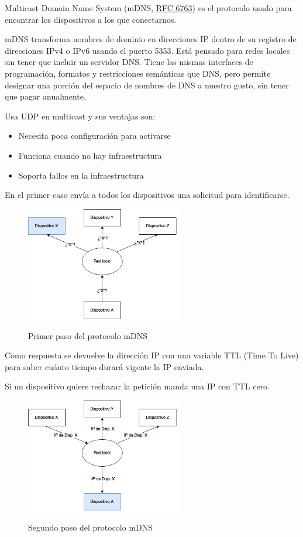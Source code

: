 Multicast Domain Name System (mDNS, \href{https://tools.ietf.org/html/rfc6763}{RFC 6763}) es el protocolo usado para encontrar los dispositivos a los que conectarnos.

mDNS transforma nombres de dominio en direcciones IP dentro de su registro de direcciones IPv4 o IPv6 usando el puerto 5353. Está pensado para redes locales sin tener que incluir un servidor DNS.
Tiene las mismas interfaces de programación, formatos y restricciones semánticas que DNS, pero permite designar una porción del espacio de nombres de DNS a nuestro gusto, sin tener que pagar anualmente.

Usa UDP en multicast y sus ventajas son:
\begin{itemize}
	\item Necesita poca configuración para activarse
	\item Funciona cuando no hay infraestructura
	\item Soporta fallos en la infraestructura
\end{itemize}

En el primer caso envía a todos los dispositivos una solicitud para identificarse.

\begin{figure}[H]
	\centering
	\includegraphics[width=0.6\textwidth]{./Imagenes/mdns1.png}
	\label{fig:mdns1}
	\caption{Primer paso del protocolo mDNS}
\end{figure}

Como respuesta se devuelve la dirección IP con una variable TTL (Time To Live) para saber cuánto tiempo durará vigente la IP enviada.

Si un dispositivo quiere rechazar la petición manda una IP con TTL cero.

\begin{figure}[H]
	\centering
	\includegraphics[width=0.6\textwidth]{./Imagenes/mdns2.png}
	\label{fig:mdns2}
	\caption{Segundo paso del protocolo mDNS}
\end{figure}